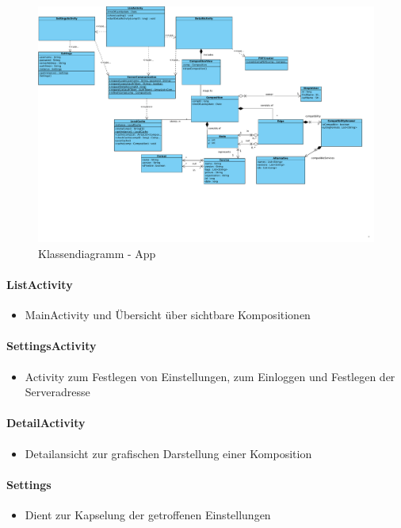 \begin{figure}[!h]
	\centering
	\includegraphics[width=\textwidth]{img/Diagramme/Klassen/App}
	\caption{Klassendiagramm - App}
	\label{fig:klassendiagramm-app}
\end{figure}

\paragraph{ListActivity}
\begin{itemize}
	\item MainActivity und Übersicht über sichtbare Kompositionen 
\end{itemize}
\paragraph{SettingsActivity}
\begin{itemize} 
	\item Activity zum Festlegen von Einstellungen, zum Einloggen und Festlegen der Serveradresse 
\end{itemize} 
\paragraph{DetailActivity}
\begin{itemize}
	\item Detailansicht zur grafischen Darstellung einer Komposition 
\end{itemize}
\paragraph{Settings} 
\begin{itemize}		
	\item Dient zur Kapselung der getroffenen Einstellungen 
\end{itemize}
